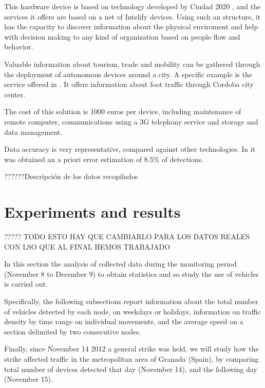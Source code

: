 \documentclass[preprint,authoryear,12pt]{elsarticle}
\begin{document}
This hardware device is based on technology developed by Ciudad 2020 \cite{cityanalytics,Blobject}, and the services it offers are based on a net of Intelify devices. Using such an structure, it has the capacity to discover information about the physical enviroment and help with decision making to any kind of organization based on people flow and behavior.

Valuable information about tourism, trade and mobility can be gathered through the deployment of autonomous devices around a city. A specific example is the service offered in \cite{numerodepersonas}. It offers information about foot traffic through Cordoba city center.

The cost of this solution is 1000 euros per device, including maintenance of remote computer, communications using a 3G telephony service and storage and data management.

Data accuracy is very representative, compared against other technologies.
In \cite{estudioprecision} it was obtained an a priori error estimation of $8.5\%$ of detections.


??????Descripción de los datos recopilados

\section{Experiments and results}
\label{sec:experiments}

????? TODO ESTO HAY QUE CAMBIARLO PARA LOS DATOS REALES CON LSO QUE AL FINAL HEMOS TRABAJADO

In this section the analysis of collected data during the monitoring period (November 8 to December 9) to obtain statistics and so study the use of vehicles is carried out.

Specifically, the following subsections report information about the total number of vehicles detected by each node, on weekdays or holidays, information on traffic density by time range on individual movements, and the average speed on a section delimited by two consecutive nodes.

Finally, since November 14 2012 a general strike was held, we will study how the strike affected traffic in the metropolitan area of Granada (Spain), by comparing total number of devices detected that day (November 14), and the following day (November 15).
\end{document}
